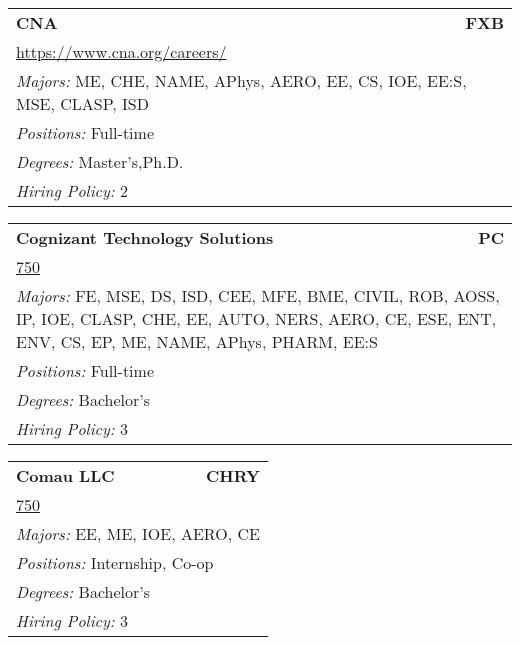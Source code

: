 \documentclass[twoside]{article}
\begin{document}
\begin{center}
\begin{multicols}{3}
\begin{FlushLeft}
\begin{minipage}{.9\columnwidth}
\end{minipage}
 
\begin{minipage}{.9\columnwidth}\begin{tabularx}{.95\columnwidth}{Xr}
                 {\Large\bf CNA} & {\Large\bf FXB}\\
    \multicolumn{2}{p{.95\columnwidth}}{\url{https://www.cna.org/careers/}}\\
    \multicolumn{2}{p{.95\columnwidth}}{\emph{Majors:} ME, CHE, NAME, APhys, AERO, EE, CS, IOE, EE:S, MSE, CLASP, ISD}\\
    \multicolumn{2}{p{.95\columnwidth}}{\emph{Positions:} Full-time}\\
    \multicolumn{2}{p{.95\columnwidth}}{\emph{Degrees:} Master's,Ph.D.}\\
    \multicolumn{2}{p{.95\columnwidth}}{\emph{Hiring Policy:} 2}\\
    \end{tabularx}
    
\end{minipage}
 
\begin{minipage}{.9\columnwidth}\begin{tabularx}{.95\columnwidth}{Xr}
                 {\Large\bf Cognizant Technology Solutions} & {\Large\bf PC}\\
    \multicolumn{2}{p{.95\columnwidth}}{\url{750}}\\
    \multicolumn{2}{p{.95\columnwidth}}{\emph{Majors:} FE, MSE, DS, ISD, CEE, MFE, BME, CIVIL, ROB, AOSS, IP, IOE, CLASP, CHE, EE, AUTO, NERS, AERO, CE, ESE, ENT, ENV, CS, EP, ME, NAME, APhys, PHARM, EE:S}\\
    \multicolumn{2}{p{.95\columnwidth}}{\emph{Positions:} Full-time}\\
    \multicolumn{2}{p{.95\columnwidth}}{\emph{Degrees:} Bachelor's}\\
    \multicolumn{2}{p{.95\columnwidth}}{\emph{Hiring Policy:} 3}\\
    \end{tabularx}
    
\end{minipage}
 
\begin{minipage}{.9\columnwidth}\begin{tabularx}{.95\columnwidth}{Xr}
                 {\Large\bf Comau LLC} & {\Large\bf CHRY}\\
    \multicolumn{2}{p{.95\columnwidth}}{\url{750}}\\
    \multicolumn{2}{p{.95\columnwidth}}{\emph{Majors:} EE, ME, IOE, AERO, CE}\\
    \multicolumn{2}{p{.95\columnwidth}}{\emph{Positions:} Internship, Co-op}\\
    \multicolumn{2}{p{.95\columnwidth}}{\emph{Degrees:} Bachelor's}\\
    \multicolumn{2}{p{.95\columnwidth}}{\emph{Hiring Policy:} 3}\\
    \end{tabularx}
    

\end{minipage}
\end{FlushLeft}
\end{multicols}
\end{center}
\end{document}
